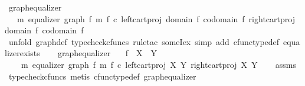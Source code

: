 \begin{isabellebody}
\isanewline
{}\isamarkupfalse%
\ graph{\isacharunderscore}{\kern0pt}equalizer{\isacharcolon}{\kern0pt}\isanewline
\ \ {\isachardoublequoteopen}{\isasymexists}\ m{\isachardot}{\kern0pt}\ equalizer\ {\isacharparenleft}{\kern0pt}graph\ f{\isacharparenright}{\kern0pt}\ m\ {\isacharparenleft}{\kern0pt}f\ {\isasymcirc}\isactrlsub c\ left{\isacharunderscore}{\kern0pt}cart{\isacharunderscore}{\kern0pt}proj\ {\isacharparenleft}{\kern0pt}domain\ f{\isacharparenright}{\kern0pt}\ {\isacharparenleft}{\kern0pt}codomain\ f{\isacharparenright}{\kern0pt}{\isacharparenright}{\kern0pt}\ {\isacharparenleft}{\kern0pt}right{\isacharunderscore}{\kern0pt}cart{\isacharunderscore}{\kern0pt}proj\ {\isacharparenleft}{\kern0pt}domain\ f{\isacharparenright}{\kern0pt}\ {\isacharparenleft}{\kern0pt}codomain\ f{\isacharparenright}{\kern0pt}{\isacharparenright}{\kern0pt}{\isachardoublequoteclose}\isanewline
%
\isadelimproof
\ \ %
\endisadelimproof
%
\isatagproof
{}\isamarkupfalse%
\ {\isacharparenleft}{\kern0pt}unfold\ graph{\isacharunderscore}{\kern0pt}def{\isacharcomma}{\kern0pt}\ typecheck{\isacharunderscore}{\kern0pt}cfuncs{\isacharcomma}{\kern0pt}\ rule{\isacharunderscore}{\kern0pt}tac\ someI{\isacharunderscore}{\kern0pt}ex{\isacharcomma}{\kern0pt}\ simp\ add{\isacharcolon}{\kern0pt}\ cfunc{\isacharunderscore}{\kern0pt}type{\isacharunderscore}{\kern0pt}def\ equalizer{\isacharunderscore}{\kern0pt}exists{\isacharparenright}{\kern0pt}%
\endisatagproof
{\isafoldproof}%
%
\isadelimproof
\isanewline
%
\endisadelimproof
\ \ \isanewline
{}\isamarkupfalse%
\ graph{\isacharunderscore}{\kern0pt}equalizer{}{\isacharcolon}{\kern0pt}\isanewline
\ \ \ {\isachardoublequoteopen}f\ {\isacharcolon}{\kern0pt}\ X\ {\isasymrightarrow}\ Y{\isachardoublequoteclose}\isanewline
\ \ \ {\isachardoublequoteopen}{\isasymexists}\ m{\isachardot}{\kern0pt}\ equalizer\ {\isacharparenleft}{\kern0pt}graph\ f{\isacharparenright}{\kern0pt}\ m\ {\isacharparenleft}{\kern0pt}f\ {\isasymcirc}\isactrlsub c\ left{\isacharunderscore}{\kern0pt}cart{\isacharunderscore}{\kern0pt}proj\ X\ Y{\isacharparenright}{\kern0pt}\ {\isacharparenleft}{\kern0pt}right{\isacharunderscore}{\kern0pt}cart{\isacharunderscore}{\kern0pt}proj\ X\ Y{\isacharparenright}{\kern0pt}{\isachardoublequoteclose}\isanewline
%
\isadelimproof
\ \ %
\endisadelimproof
%
\isatagproof
{}\isamarkupfalse%
\ assms\ \isamarkupfalse%
\ {\isacharparenleft}{\kern0pt}typecheck{\isacharunderscore}{\kern0pt}cfuncs{\isacharcomma}{\kern0pt}\ metis\ cfunc{\isacharunderscore}{\kern0pt}type{\isacharunderscore}{\kern0pt}def\ graph{\isacharunderscore}{\kern0pt}equalizer{\isacharparenright}{\kern0pt}%

\end{isabellebody}

